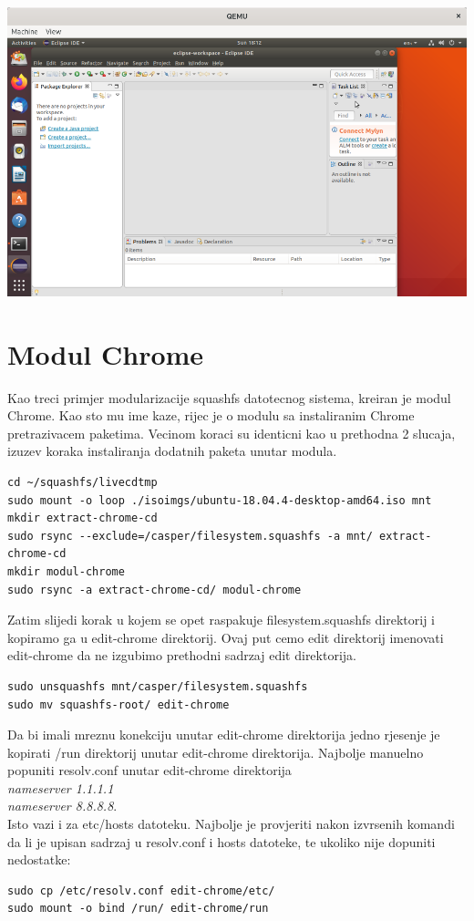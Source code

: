 \documentclass[12pt,vi]{mitthesis}
\begin{document}
\includegraphics[width=\linewidth]{images/eclipseLive1.png} 

\chapter*{Modul Chrome}
Kao treci primjer modularizacije squashfs datotecnog sistema, kreiran je modul Chrome. Kao sto mu ime kaze, rijec je o modulu sa instaliranim Chrome pretrazivacem paketima. Vecinom koraci su identicni kao u prethodna 2 slucaja, izuzev koraka instaliranja dodatnih paketa unutar modula.\\
\begin{lstlisting}[style=BashInputStyle]
cd ~/squashfs/livecdtmp
sudo mount -o loop ./isoimgs/ubuntu-18.04.4-desktop-amd64.iso mnt
mkdir extract-chrome-cd
sudo rsync --exclude=/casper/filesystem.squashfs -a mnt/ extract-chrome-cd
mkdir modul-chrome
sudo rsync -a extract-chrome-cd/ modul-chrome
\end{lstlisting}
Zatim slijedi korak u kojem se opet raspakuje filesystem.squashfs direktorij i kopiramo ga u edit-chrome direktorij. Ovaj put cemo edit direktorij imenovati edit-chrome da ne izgubimo prethodni sadrzaj edit direktorija.\\
\begin{lstlisting}[style=BashInputStyle]
sudo unsquashfs mnt/casper/filesystem.squashfs
sudo mv squashfs-root/ edit-chrome
\end{lstlisting}

\noindent
Da bi imali mreznu konekciju unutar edit-chrome direktorija jedno rjesenje je kopirati /run direktorij unutar edit-chrome direktorija.
Najbolje manuelno popuniti resolv.conf unutar edit-chrome direktorija \\\textit{nameserver 1.1.1.1 \\
nameserver 8.8.8.8}.\\
Isto vazi i za etc/hosts datoteku. Najbolje je provjeriti nakon izvrsenih komandi da li je upisan sadrzaj u resolv.conf i hosts datoteke, te ukoliko nije dopuniti nedostatke:
\begin{lstlisting}[style=BashInputStyle]
sudo cp /etc/resolv.conf edit-chrome/etc/
sudo mount -o bind /run/ edit-chrome/run
\end{lstlisting}
\end{document}
